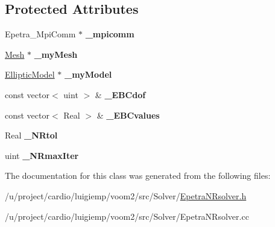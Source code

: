 \subsection*{Protected Attributes}
\begin{DoxyCompactItemize}
\item 
\hypertarget{classvoom_1_1_epetra_n_rsolver_a6a99fbbaa2940bbf07dc3b9d3015af54}{
Epetra\_\-MpiComm $\ast$ {\bfseries \_\-mpicomm}}
\label{classvoom_1_1_epetra_n_rsolver_a6a99fbbaa2940bbf07dc3b9d3015af54}

\item 
\hypertarget{classvoom_1_1_epetra_n_rsolver_ae6fae2326e4484ba1679872c318bf870}{
\hyperlink{classvoom_1_1_mesh}{Mesh} $\ast$ {\bfseries \_\-myMesh}}
\label{classvoom_1_1_epetra_n_rsolver_ae6fae2326e4484ba1679872c318bf870}

\item 
\hypertarget{classvoom_1_1_epetra_n_rsolver_a684645af12f7c7616220e04def39b5a9}{
\hyperlink{classvoom_1_1_elliptic_model}{EllipticModel} $\ast$ {\bfseries \_\-myModel}}
\label{classvoom_1_1_epetra_n_rsolver_a684645af12f7c7616220e04def39b5a9}

\item 
\hypertarget{classvoom_1_1_epetra_n_rsolver_a33db401ded52b5c31a658f73a59a0676}{
const vector$<$ uint $>$ \& {\bfseries \_\-EBCdof}}
\label{classvoom_1_1_epetra_n_rsolver_a33db401ded52b5c31a658f73a59a0676}

\item 
\hypertarget{classvoom_1_1_epetra_n_rsolver_a192734341c10256dbb7224781201ed92}{
const vector$<$ Real $>$ \& {\bfseries \_\-EBCvalues}}
\label{classvoom_1_1_epetra_n_rsolver_a192734341c10256dbb7224781201ed92}

\item 
\hypertarget{classvoom_1_1_epetra_n_rsolver_abdafbed36dea7a067ad04e1341f87757}{
Real {\bfseries \_\-NRtol}}
\label{classvoom_1_1_epetra_n_rsolver_abdafbed36dea7a067ad04e1341f87757}

\item 
\hypertarget{classvoom_1_1_epetra_n_rsolver_a7937cc5479f86c2f7b1907e55a66bc0f}{
uint {\bfseries \_\-NRmaxIter}}
\label{classvoom_1_1_epetra_n_rsolver_a7937cc5479f86c2f7b1907e55a66bc0f}

\end{DoxyCompactItemize}


The documentation for this class was generated from the following files:\begin{DoxyCompactItemize}
\item 
/u/project/cardio/luigiemp/voom2/src/Solver/\hyperlink{_epetra_n_rsolver_8h}{EpetraNRsolver.h}\item 
/u/project/cardio/luigiemp/voom2/src/Solver/EpetraNRsolver.cc\end{DoxyCompactItemize}
